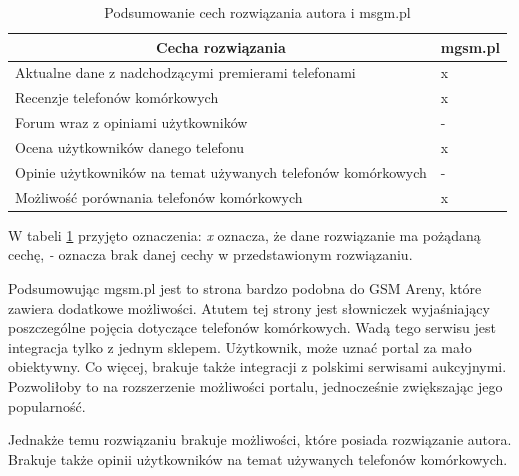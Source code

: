 \begin{table}[H]
    \centering
    \begin{tabular}{|l|l|}
        \hline
        \multicolumn{1}{|c|}{Cecha rozwiązania}    & \multicolumn{1}{c|}{mgsm.pl} \\ \hline
        Aktualne dane z nadchodzącymi premierami telefonami & x                             \\ \hline
        Recenzje telefonów komórkowych                                  & x                                \\ \hline
        Forum wraz z opiniami użytkowników                   & -                                \\ \hline
        Ocena użytkowników danego telefonu                  & x                             \\ \hline
        Opinie użytkowników na temat używanych telefonów komórkowych    & -                                 \\ \hline
        Możliwość porównania telefonów komórkowych                      & x                                \\ \hline
    \end{tabular}
    \caption{Podsumowanie cech rozwiązania autora i msgm.pl}
    \label{comparison_mgsm}
\end{table}
W tabeli \ref*{comparison_mgsm} przyjęto oznaczenia: \textit{x} oznacza, że dane rozwiązanie ma pożądaną cechę, \textit{-} oznacza brak danej cechy w przedstawionym rozwiązaniu.

Podsumowując mgsm.pl jest to strona bardzo podobna do GSM Areny, które zawiera dodatkowe możliwości. Atutem tej strony jest słowniczek wyjaśniający poszczególne pojęcia dotyczące telefonów komórkowych. Wadą tego serwisu jest integracja tylko z jednym sklepem. Użytkownik, może uznać portal za mało obiektywny. Co więcej, brakuje także integracji z polskimi serwisami aukcyjnymi. Pozwoliłoby to na rozszerzenie możliwości portalu, jednocześnie zwiększając jego popularność.

Jednakże temu rozwiązaniu brakuje możliwości, które posiada rozwiązanie autora. Brakuje także opinii użytkowników na temat używanych telefonów komórkowych. 

\newpage
